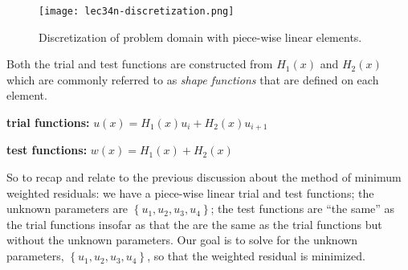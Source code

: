 \begin{figure}[h!]
\texttt{[image: lec34n-discretization.png]}
\caption{Discretization of problem domain with piece-wise linear elements.}
\label{fig:lec34n-discretization}
\end{figure}
\noindent Both the trial and test functions are constructed from $H_1(x)$ and $H_2(x)$ which are commonly referred to as \emph{shape functions} that are defined on each element.

\vspace{0.25cm}

\noindent\textbf{trial functions:} $u(x) = H_1(x)u_i + H_2(x)u_{i+1}$

\vspace{0.25cm}

\noindent\textbf{test functions:} $w(x) = H_1(x) + H_2(x)$

\vspace{0.25cm}

\noindent So to recap and relate to the previous discussion about the method of minimum weighted residuals: we have a piece-wise linear trial and test functions; the unknown parameters are $\left\{u_1,u_2,u_3,u_4\right\}$; the test functions are ``the same'' as the trial functions insofar as that the are the same as the trial functions but without the unknown parameters.  Our goal is to solve for the unknown parameters, $\left\{u_1,u_2,u_3,u_4\right\}$, so that the weighted residual is minimized.

